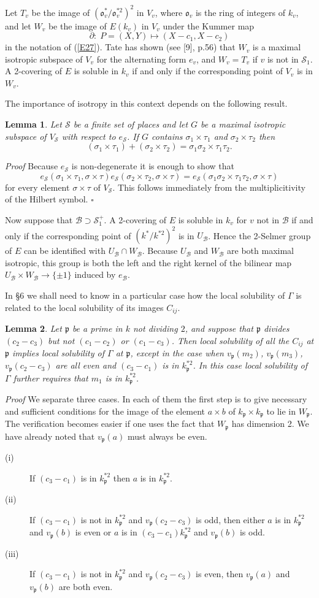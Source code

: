 \documentclass[12pt]{article}
\def\fo{{\mathfrak o}}
\def\fp{{\mathfrak p}}
\def\gG{{\Gamma}}
\def\gs{{\sigma}}
\def\sB{{\mathcal B}}
\def\sS{{\mathcal S}}
\def\qed{{\hfill$\square$}}
\def\ble{\begin{lemma} \label}
\def\ele{\end{lemma}}
\newtheorem{lemma}{Lemma}
\begin{document}
Let $T_v$ be the image of $(\fo^*_v/\fo_v^{*2})^2$ in $V_v$, where $\fo_v$ is
the ring of integers of $k_v$, and let $W_v$ be the image of $E(k_v)$ in $V_v$
under the Kummer map
\[ \partial:\;P=(X,Y)\mapsto(X-c_1,X-c_2) \]
in the notation of (\ref{E27}).
Tate has shown (see [9], p.56) that $W_v$ is
a maximal isotropic subspace of $V_v$ for the alternating form $e_v$, and
$W_v=T_v$ if $v$ is not in $\sS_1$. A 2-covering of $E$ is soluble in $k_v$ if
and only if the corresponding point of $V_v$ is in $W_v$.

The importance of isotropy in this context depends on the
following result.
\ble{L6} Let $\sS$ be a finite set of places and let $G$ be a
maximal isotropic subspace of $V_\sS$ with respect to $e_\sS$.
If $G$ contains $\gs_1\times\tau_1$ and $\gs_2
\times\tau_2$ then
\[ (\gs_1\times\tau_1)+(\gs_2\times\tau_2)=
\gs_1\gs_2\times\tau_1\tau_2. \]
\ele
\emph{Proof} Because $e_\sS$ is non-degenerate it is enough
to show that
\[ e_\sS(\gs_1\times\tau_1,\gs\times\tau)
e_\sS(\gs_2\times\tau_2,\gs\times\tau)
=e_\sS(\gs_1\gs_2\times\tau_1\tau_2,\gs\times\tau) \]
for every element $\gs\times\tau$ of $V_\sS$. This follows
immediately from 
the multiplicitivity of the Hilbert symbol.  \qed

Now suppose that $\sB\supset\sS_1^+$. A 2-covering of $E$ is soluble in $k_v$
for $v$ not in $\sB$ if and only if the corresponding point of $(k^*/k^{*2})^2$
is in $U_\sB$. Hence the 2-Selmer group of $E$ can be identified with
$U_\sB\cap W_\sB$. Because $U_\sB$ and $W_\sB$ are both
maximal isotropic, this group is both the left and
the right kernel of the bilinear map $U_\sB\times W_\sB\rightarrow\{\pm1\}$
induced by $e_\sB$.

\medskip

In \S6 we shall need to know in a particular case how the local solubility of
$\gG$ is related to the local solubility of its images $C_{ij}$.
\ble{L14} Let $\fp$ be a prime in $k$ not dividing $2$, and suppose that $\fp$
divides $(c_2-c_3)$ but not $(c_1-c_2)$ or $(c_1-c_3)$. Then local solubility
of all the $C_{ij}$ at $\fp$ implies local solubility of $\gG$ at $\fp$,
except in the case when $v_\fp(m_2)$, $v_\fp(m_3)$, $v_\fp(c_2-c_3)$ are all
even and $(c_3-c_1)$ is in $k_\fp^{*2}$. In this case local solubility of
$\gG$ further requires that $m_1$ is in $k_\fp^{*2}$.
\ele
\emph{Proof} We separate three cases. In each of them the
first step is to give necessary and sufficient conditions for
the image of the element $a\times b$ of $k_\fp\times k_\fp$
to lie in $W_\fp$. The verification becomes easier if one uses
the fact that $W_\fp$ has dimension 2. We have already noted
that $v_\fp(a)$ must always be even.
\begin{description}
\item[(i)] If $(c_3-c_1)$ is in $k_\fp^{*2}$ then $a$ is in
$k_\fp^{*2}$.
\item[(ii)] If $(c_3-c_1)$ is not in $k_\fp^{*2}$ and
$v_\fp(c_2-c_3)$ is odd, then either $a$ is in $k_\fp^{*2}$
and $v_\fp(b)$ is even or $a$ is in
$(c_3-c_1)k_\fp^{*2}$ and $v_\fp(b)$ is odd.
\item[(iii)] If $(c_3-c_1)$ is not in $k_\fp^{*2}$ and $v_\fp(c_2-c_3)$ is even,
then $v_\fp(a)$ and $v_\fp(b)$ are both even.
\end{description}
\end{document}
